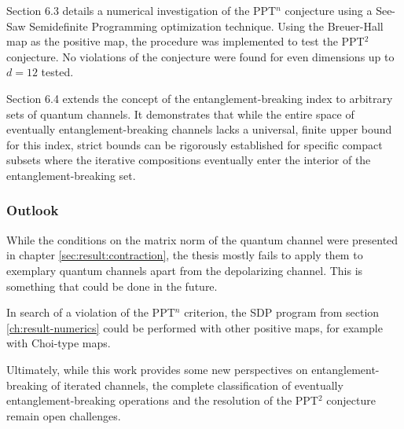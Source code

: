 Section 6.3 details a numerical investigation of the PPT$^n$ conjecture using a See-Saw Semidefinite Programming optimization technique. Using the Breuer-Hall map as the positive map, the procedure was implemented to test the PPT$^2$ conjecture. No violations of the conjecture were found for even dimensions up to $d=12$ tested.  

Section 6.4 extends the concept of the entanglement-breaking index to arbitrary sets of quantum channels. It demonstrates that while the entire space of eventually entanglement-breaking channels lacks a universal, finite upper bound for this index, strict bounds can be rigorously established for specific compact subsets where the iterative compositions eventually enter the interior of the entanglement-breaking set.

\subsubsection{Outlook}
While the conditions on the matrix norm of the quantum channel were presented in chapter \ref{sec:result:contraction}, the thesis mostly fails to apply them to exemplary quantum channels apart from the depolarizing channel. This is something that could be done in the future.

In search of a violation of the PPT$^n$ criterion, the SDP program from section \ref{ch:result-numerics} could be performed with other positive maps, for example with Choi-type maps.

Ultimately, while this work provides some new perspectives on entanglement-breaking of iterated channels, the complete classification of eventually entanglement-breaking operations and the resolution of the PPT$^2$ conjecture remain open challenges.
